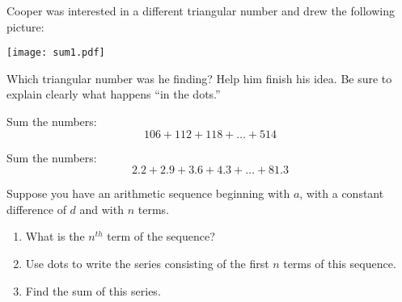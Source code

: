 \documentclass{ximera}
\begin{document}
\begin{problem}
Cooper was interested in a different triangular number and drew the following picture:   
\begin{image}
\texttt{[image: sum1.pdf]}
\end{image}
Which triangular number was he finding?  Help him finish his idea.  Be sure to explain clearly what 
happens ``in the dots.'' 
\end{problem}


\begin{problem}
Sum the numbers:  
\[
106 + 112 + 118 + \dots + 514
\]
\end{problem}

\begin{problem}
Sum the numbers:
\[
2.2 + 2.9 + 3.6 + 4.3 + \dots + 81.3
\]
\end{problem}


\begin{problem}
Suppose you have an arithmetic sequence beginning with $a$, with a constant difference of $d$ and with $n$ terms.  
\begin{enumerate}
\item What is the $n^{th}$ term of the sequence?  
\item Use dots to write the series consisting of the first $n$ terms of this sequence.
\item Find the sum of this series.  
\end{enumerate}
\end{problem}
\end{document}
